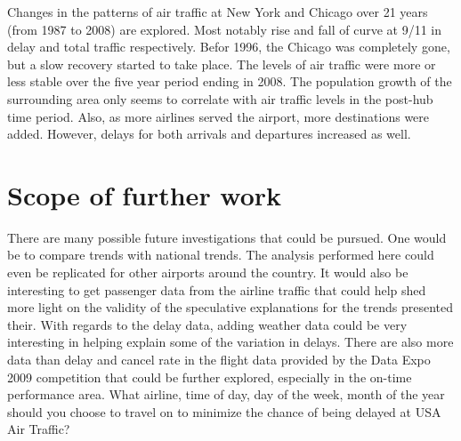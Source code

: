 Changes in the patterns of air traffic at New York and Chicago over 21 years (from 1987 to 2008) are explored. Most notably rise and fall of curve at 9/11 in delay and total traffic respectively. Befor 1996, the Chicago was
completely gone, but a slow recovery started to take place. The levels of air traffic were more or less stable
over the five year period ending in 2008. The population growth of the surrounding area only seems to correlate
with air traffic levels in the post-hub time period. Also, as more airlines served the airport, more destinations were added. However, delays for both arrivals and departures increased as well.


\section{Scope of further work}
There are many possible future investigations that could be pursued. One would be to compare trends with national trends. The analysis performed here could even be replicated for other airports around the country.
It would also be interesting to get passenger data from the airline traffic that could help shed more light on the validity of the speculative explanations for the trends presented their. With regards to the delay
data, adding weather data could be very interesting in helping explain some of the variation in delays. There are also more data than delay and cancel rate in the flight data provided by the Data Expo 2009 competition that could be further explored, especially in the on-time performance area. What airline, time of day, day of the week, month of the year should you choose to travel on to minimize the chance of being delayed at USA Air Traffic?